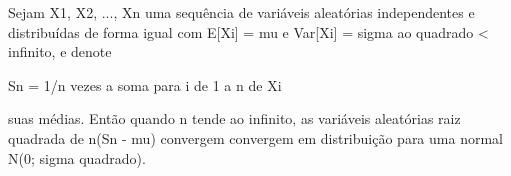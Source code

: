 \documentclass{article}
\begin{document}

Sejam X1, X2, ..., Xn uma sequência de variáveis aleatórias
independentes e distribuídas de forma igual com E[Xi] = mu e Var[Xi] = sigma
ao quadrado < infinito, e denote

Sn = 1/n vezes a soma para i de 1 a n de Xi

suas médias. Então quando n tende ao infinito, as variáveis aleatórias raiz
quadrada de  n(Sn - mu) convergem convergem em distribuição para uma normal N(0;
sigma quadrado).
\end{document}
